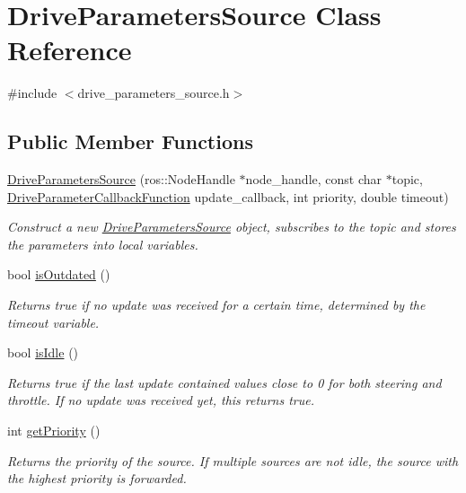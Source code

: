 \hypertarget{class_drive_parameters_source}{}\section{Drive\+Parameters\+Source Class Reference}
\label{class_drive_parameters_source}


{\ttfamily \#include $<$drive\+\_\+parameters\+\_\+source.\+h$>$}

\subsection*{Public Member Functions}
\begin{DoxyCompactItemize}
\item 
\hyperlink{class_drive_parameters_source_ab6ab4aa02955d8929ee04669faef1be2}{Drive\+Parameters\+Source} (ros\+::\+Node\+Handle $\ast$node\+\_\+handle, const char $\ast$topic, \hyperlink{drive__parameters__source_8h_a87328cd02ddd6c83ff6d4943cf8a93c2}{Drive\+Parameter\+Callback\+Function} update\+\_\+callback, int priority, double timeout)
\begin{DoxyCompactList}\small\item\em Construct a new \hyperlink{class_drive_parameters_source}{Drive\+Parameters\+Source} object, subscribes to the topic and stores the parameters into local variables. \end{DoxyCompactList}\item 
bool \hyperlink{class_drive_parameters_source_a19ac7507bffaa6167393d24fe5f7f67e}{is\+Outdated} ()
\begin{DoxyCompactList}\small\item\em Returns true if no update was received for a certain time, determined by the timeout variable. \end{DoxyCompactList}\item 
bool \hyperlink{class_drive_parameters_source_a716e9da760080cdc8d0e69553932c789}{is\+Idle} ()
\begin{DoxyCompactList}\small\item\em Returns true if the last update contained values close to 0 for both steering and throttle. If no update was received yet, this returns true. \end{DoxyCompactList}\item 
int \hyperlink{class_drive_parameters_source_a0ca68bb4cf93f5124c60330582ba82dc}{get\+Priority} ()
\begin{DoxyCompactList}\small\item\em Returns the priority of the source. If multiple sources are not idle, the source with the highest priority is forwarded. \end{DoxyCompactList}\end{DoxyCompactItemize}


